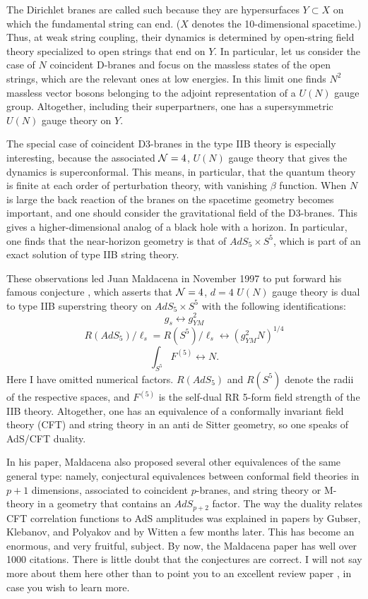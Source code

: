 \documentclass[a4paper,12pt]{article}
\begin{document}
The Dirichlet branes are called such because they are
hypersurfaces $Y\subset X$ on which the fundamental string can
end. ($X$ denotes the 10-dimensional spacetime.)  Thus, at weak
string coupling, their dynamics is determined by open-string field
theory specialized to open strings that end on $Y$.  In
particular, let us consider the case of $N$ coincident D-branes
and focus on the massless states of the open strings, which are
the relevant ones at low energies. In this limit one finds $N^2$
massless vector bosons belonging to the adjoint representation of
a $U(N)$ gauge group. Altogether, including their superpartners,
one has a supersymmetric $U(N)$ gauge theory on $Y$.

The special case of coincident D$3$-branes in the type IIB theory
is especially interesting, because the associated ${\cal N} = 4$,
$U(N)$ gauge theory that gives the dynamics is superconformal.
This means, in particular, that the quantum theory is finite at
each order of perturbation theory, with vanishing $\beta$
function. When $N$ is large the back reaction of the branes on the
spacetime geometry becomes important, and one should consider the
gravitational field of the D$3$-branes. This gives a
higher-dimensional analog of a black hole with a horizon. In
particular, one finds that the near-horizon geometry is that of
$AdS_5 \times S^5$, which is part of an exact solution of type IIB
string theory.

These observations led Juan Maldacena in November 1997 to put
forward his famous conjecture \cite{JM}, which asserts that ${\cal N} = 4$,
$d = 4$ $U(N)$ gauge theory is dual to type IIB superstring theory
on $AdS_5 \times S^5$ with the following identifications: $$ g_s
\leftrightarrow g^2_{YM}$$ $$ R(AdS_5)/\ell_s = R(S^5)/\ell_s
\leftrightarrow (g_{YM}^2 N)^{1/4}$$
\begin{equation}
\int_{S^5} F^{(5)} \leftrightarrow N.
\end{equation}
Here I have omitted numerical factors.  $R(AdS_5)$ and $R(S^5)$
denote the radii of the respective spaces, and $F^{(5)}$ is the
self-dual RR 5-form field strength of the IIB theory. Altogether,
one has an equivalence of a conformally invariant field theory
(CFT) and string theory in an anti de Sitter geometry, so one
speaks of AdS/CFT duality.

In his paper, Maldacena also proposed several other equivalences
of the same general type: namely, conjectural equivalences between
conformal field theories in $p+1$ dimensions, associated to
coincident $p$-branes, and string theory or M-theory in a geometry
that contains an $AdS_{p+2}$ factor. The way the duality relates
CFT correlation functions to AdS amplitudes was explained in
papers by Gubser, Klebanov, and Polyakov \cite{GKP} and by Witten
\cite{W1} a few months later. This has become an enormous, and
very fruitful, subject. By now, the Maldacena paper has well over
1000 citations. There is little doubt that the conjectures are
correct. I will not say more about them here other than to point
you to an excellent review paper \cite{MAGOO}, in case you wish to
learn more.
\end{document}
